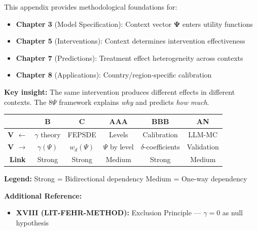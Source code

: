 \begin{tcolorbox}[colback=gray!10!white, colframe=gray!75!black, 
    title=\textbf{Chapter Linkages}]

This appendix provides methodological foundations for:

\begin{itemize}[nosep]
    \item \textbf{Chapter 3} (Model Specification): Context vector $\boldsymbol{\Psi}$ enters utility functions
    \item \textbf{Chapter 5} (Interventions): Context determines intervention effectiveness
    \item \textbf{Chapter 7} (Predictions): Treatment effect heterogeneity across contexts
    \item \textbf{Chapter 8} (Applications): Country/region-specific calibration
\end{itemize}

\textbf{Key insight:} The same intervention produces different effects in different 
contexts. The 8$\Psi$ framework explains \textit{why} and predicts \textit{how much}.

\end{tcolorbox}


\begin{tcolorbox}[colback=white, colframe=black, 
    title=\textbf{Cross-Reference Map}]

\begin{center}
\small
\begin{tabular}{@{}c|ccccc@{}}
\toprule
& \textbf{B} & \textbf{C} & \textbf{AAA} & \textbf{BBB} & \textbf{AN} \\
\midrule
\textbf{V $\leftarrow$} & $\gamma$ theory & FEPSDE & Levels & Calibration & LLM-MC \\
\textbf{V $\rightarrow$} & $\gamma(\Psi)$ & $w_d(\Psi)$ & $\Psi$ by level & $\delta$-coefficients & Validation \\
\midrule
\textbf{Link} & \cellcolor{red!20}Strong & \cellcolor{red!20}Strong & \cellcolor{yellow!20}Medium & \cellcolor{red!20}Strong & \cellcolor{yellow!20}Medium \\
\bottomrule
\end{tabular}
\end{center}

\textbf{Legend:}
\colorbox{red!20}{Strong} = Bidirectional dependency \quad
\colorbox{yellow!20}{Medium} = One-way dependency

\textbf{Additional Reference:}
\begin{itemize}[nosep]
    \item \textbf{XVIII (LIT-FEHR-METHOD):} Exclusion Principle --- $\gamma = 0$ as null hypothesis
\end{itemize}

\end{tcolorbox}

